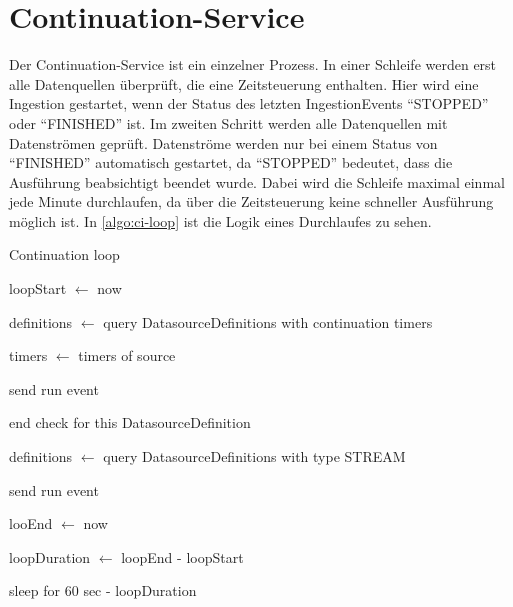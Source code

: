 \section{Continuation-Service}

Der Continuation-Service ist ein einzelner Prozess.
In einer Schleife werden erst alle Datenquellen überprüft, die eine Zeitsteuerung enthalten.
Hier wird eine Ingestion gestartet, wenn der Status des letzten IngestionEvents "`STOPPED"' oder "`FINISHED"' ist.
Im zweiten Schritt werden alle Datenquellen mit Datenströmen geprüft.
Datenströme werden nur bei einem Status von "`FINISHED"' automatisch gestartet, da "`STOPPED"' bedeutet, dass die Ausführung beabsichtigt beendet wurde.
Dabei wird die Schleife maximal einmal jede Minute durchlaufen, da über die Zeitsteuerung keine schneller Ausführung möglich ist.
In \cref{algo:ci-loop} ist die Logik eines Durchlaufes zu sehen.

\begin{algorithm}
    \caption{Continuation loop}
    \label{algo:ci-loop}

    loopStart $\gets$ now \

    definitions $\gets$ query DatasourceDefinitions with continuation timers \

     {

        timers $\gets$ timers of source \

         {

             {

                 {

                    send run event \

                    end check for this DatasourceDefinition \
                }
            }
        }
    }

    definitions $\gets$ query DatasourceDefinitions with type STREAM \
     {

         {

            send run event \
        }
    }

    looEnd $\gets$ now \

    loopDuration $\gets$ loopEnd - loopStart \

     {

        sleep for 60 sec - loopDuration \
    }

\end{algorithm}

